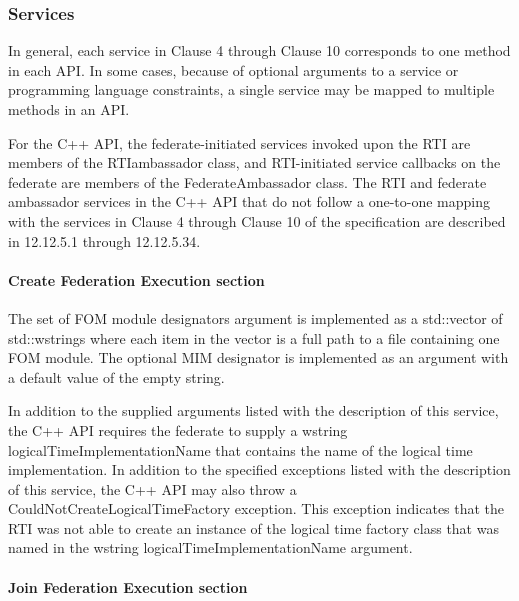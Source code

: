 \clearpage

\begin{compactstdpage}
    \cxiitabletwentytwo

    \subsubsection{Services}

    In general, each service in Clause 4 through Clause 10 corresponds to one method in each API. In some cases, because of optional arguments to a service or programming language constraints, a single service may be mapped to multiple methods in an API.

    For the C++ API, the federate-initiated services invoked upon the RTI are members of the RTIambassador class, and RTI-initiated service callbacks on the federate are members of the FederateAmbassador class. The RTI and federate ambassador services in the C++ API that do not follow a one-to-one mapping with the services in Clause 4 through Clause 10 of the specification are described in 12.12.5.1 through 12.12.5.34.

    \paragraph{Create Federation Execution section}

    The set of FOM module designators argument is implemented as a std::vector of std::wstrings where each item in the vector is a full path to a file containing one FOM module. The optional MIM designator is implemented as an argument with a default value of the empty string.

    In addition to the supplied arguments listed with the description of this service, the C++ API requires the federate to supply a wstring logicalTimeImplementationName that contains the name of the logical time implementation. In addition to the specified exceptions listed with the description of this service, the C++ API may also throw a CouldNotCreateLogicalTimeFactory exception. This exception indicates that the RTI was not able to create an instance of the logical time factory class that was named in the wstring logicalTimeImplementationName argument.

    \paragraph{Join Federation Execution section}


\end{compactstdpage}
